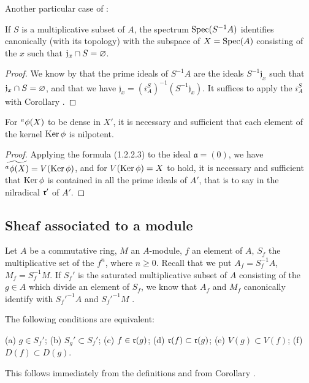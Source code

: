 Another particular case of :
\begin{cor}[1.2.6]
\label{1.1.2.6}
If $S$ is a multiplicative subset of $A$, the spectrum ${\mathop{\mathrm{Spec}}\nolimits}(S^{-1}A)$ identifies
canonically (with its topology) with the subspace of $X={\mathop{\mathrm{Spec}}\nolimits}(A)$ consisting of the $x$
such that $\mathfrak{j}_x\cap S=\varnothing$.
\end{cor}

\begin{proof}
\label{proof-1.1.2.6}
We know by  that the prime ideals of $S^{-1}A$ are the ideals
$S^{-1}\mathfrak{j}_x$ such that $\mathfrak{j}_x\cap S=\varnothing$, and that we have
$\mathfrak{j}_x=(i_A^S)^{-1}(S^{-1}\mathfrak{j}_x)$. It suffices to apply the $i_A^S$
with Corollary .
\end{proof}

\begin{cor}[1.2.7]
\label{1.1.2.7}
For ${}^a\phi(X)$ to be dense in $X'$, it is necessary and sufficient that each element
of the kernel ${\mathop{\mathrm{Ker}}\nolimits}\,\phi$ is nilpotent.
\end{cor}

\begin{proof}
\label{proof-1.1.2.7}
Applying the formula (1.2.2.3) to the ideal $\mathfrak{a}=(0)$, we have
$\widetilde{{}^a\phi(X)}=V({\mathop{\mathrm{Ker}}\nolimits}\,\phi)$, and for $V({\mathop{\mathrm{Ker}}\nolimits}\,\phi)=X$ to hold, it is necessary
and sufficient that ${\mathop{\mathrm{Ker}}\nolimits}\,\phi$ is contained in all the prime ideals of $A'$, that is to say
in the nilradical $\mathfrak{r}'$ of $A'$.
\end{proof}

\subsection{Sheaf associated to a module}
\label{subsection-assoc-sheaf}

\begin{env}[1.3.1]
\label{1.1.3.1}
Let $A$ be a commutative ring, $M$ an $A$-module, $f$ an element of $A$, $S_f$ the
multiplicative set of the $f^n$, where $n\geqslant 0$. Recall that we put $A_f=S_f^{-1}A$,
$M_f=S_f^{-1}M$. If $S_f'$ is the saturated multiplicative subset of $A$ consisting of the
$g\in A$ which divide an element of $S_f$, we know that $A_f$ and $M_f$ canonically identify
with ${S_f'}^{-1}A$ and ${S_f'}^{-1}M$ .
\end{env}

\begin{lem}[1.3.2]
\label{1.1.3.2}
The following conditions are equivalent:
\begin{center}
{\rm(a)} $g\in S_f'$;
{\rm(b)} $S_g'\subset S_f'$;
{\rm(c)} $f\in\mathfrak{r}(g)$;
{\rm(d)} $\mathfrak{r}(f)\subset\mathfrak{r}(g)$;
{\rm(e)} $V(g)\subset V(f)$;
{\rm(f)} $D(f)\subset D(g)$.
\end{center}
\end{lem}
This follows immediately from the definitions and from
Corollary .

